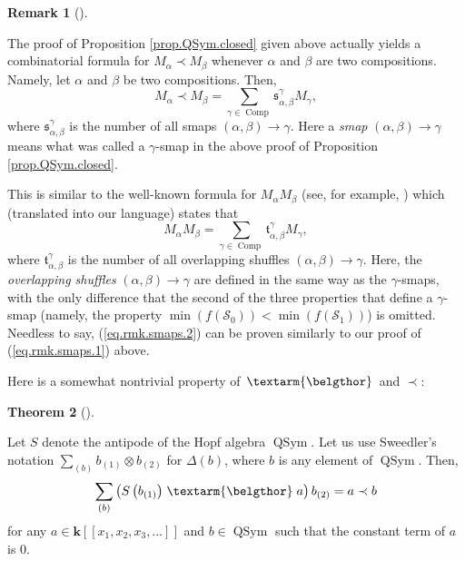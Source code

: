 \documentclass[numbers=enddot,12pt,final,onecolumn,notitlepage,abstracton]{scrartcl}%
\theoremstyle{definition}
\newtheorem{theo}{Theorem}[section]
\newenvironment{theorem}[1][]
{\begin{theo}[#1]\begin{leftbar}}
{\end{leftbar}\end{theo}}
\newtheorem{remk}[theo]{Remark}
\newenvironment{remark}[1][]
{\begin{remk}[#1]\begin{leftbar}}
{\end{leftbar}\end{remk}}
\newcommand{\bel}{\left. \textarm{\belgthor} \right.}
\let\sumnonlimits\sum
\renewcommand{\sum}{\sumnonlimits\limits}
\begin{document}
\begin{remark}
\label{rmk.QSym.closed}The proof of Proposition \ref{prop.QSym.closed} given
above actually yields a combinatorial formula for $M_{\alpha}\left.
\prec\right.  M_{\beta}$ whenever $\alpha$ and $\beta$ are two compositions.
Namely, let $\alpha$ and $\beta$ be two compositions. Then,%
\begin{equation}
M_{\alpha}\left.  \prec\right.  M_{\beta}=\sum_{\gamma\in\operatorname*{Comp}%
}\mathfrak{s}_{\alpha,\beta}^{\gamma}M_{\gamma}, \label{eq.rmk.smaps.1}%
\end{equation}
where $\mathfrak{s}_{\alpha,\beta}^{\gamma}$ is the number of all smaps
$\left(  \alpha,\beta\right)  \rightarrow\gamma$. Here a \textit{smap}
$\left(  \alpha,\beta\right)  \rightarrow\gamma$ means what was called a
$\gamma$-smap in the above proof of Proposition \ref{prop.QSym.closed}.

This is similar to the well-known formula for $M_{\alpha}M_{\beta}$ (see, for
example, \cite[Proposition 5.1.3]{Reiner}) which (translated into our
language) states that
\begin{equation}
M_{\alpha}M_{\beta}=\sum_{\gamma\in\operatorname*{Comp}}\mathfrak{t}%
_{\alpha,\beta}^{\gamma}M_{\gamma}, \label{eq.rmk.smaps.2}%
\end{equation}
where $\mathfrak{t}_{\alpha,\beta}^{\gamma}$ is the number of all overlapping
shuffles $\left(  \alpha,\beta\right)  \rightarrow\gamma$. Here, the
\textit{overlapping shuffles} $\left(  \alpha,\beta\right)  \rightarrow\gamma$
are defined in the same way as the $\gamma$-smaps, with the only difference
that the second of the three properties that define a $\gamma$-smap (namely,
the property $\min\left(  f\left(  \mathcal{S}_{0}\right)  \right)
<\min\left(  f\left(  \mathcal{S}_{1}\right)  \right)  $) is omitted. Needless
to say, (\ref{eq.rmk.smaps.2}) can be proven similarly to our proof of
(\ref{eq.rmk.smaps.1}) above.
\end{remark}

Here is a somewhat nontrivial property of $\bel $ and $\left.  \prec\right.  $:


\begin{theorem}
\label{thm.beldend}Let $S$ denote the antipode of the Hopf algebra
$\operatorname*{QSym}$. Let us use Sweedler's notation $\sum_{\left(
b\right)  }b_{\left(  1\right)  }\otimes b_{\left(  2\right)  }$ for
$\Delta\left(  b\right)  $, where $b$ is any element of $\operatorname*{QSym}%
$. Then,%
\[
\sum_{\left(  b\right)  }\left(  S\left(  b_{\left(  1\right)  }\right)
\bel
a\right)  b_{\left(  2\right)  }=a\left.  \prec\right.  b
\]
for any $a\in\mathbf{k}\left[  \left[  x_{1},x_{2},x_{3},\ldots\right]
\right]  $ and $b\in\operatorname*{QSym}$ such that the constant term of $a$
is $0$.
\end{theorem}
\end{document}
